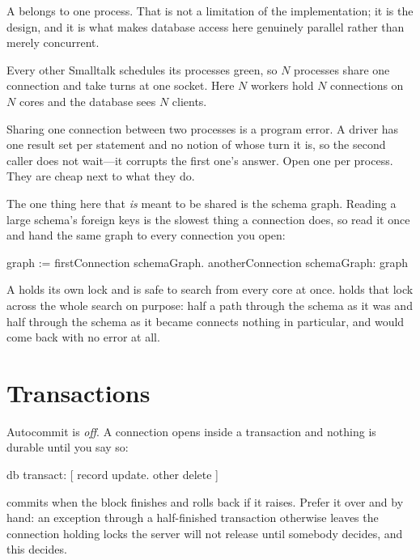 A  belongs to one process. That is not a limitation of the
implementation; it is the design, and it is what makes database access here
genuinely parallel rather than merely concurrent.

Every other Smalltalk schedules its processes green, so $N$ processes share
one connection and take turns at one socket. Here $N$ workers hold $N$
connections on $N$ cores and the database sees $N$ clients.

\begin{stwarn}
Sharing one connection between two processes is a program error. A driver has
one result set per statement and no notion of whose turn it is, so the second
caller does not wait---it corrupts the first one's answer. Open one per
process. They are cheap next to what they do.
\end{stwarn}

The one thing here that \emph{is} meant to be shared is the schema graph.
Reading a large schema's foreign keys is the slowest thing a connection does, so
read it once and hand the same graph to every connection you open:

\begin{st}
graph := firstConnection schemaGraph.
anotherConnection schemaGraph: graph
\end{st}

\noindent A  holds its own lock and is safe to search from
every core at once.  holds that lock across the whole
search on purpose: half a path through the schema as it was and half through the
schema as it became connects nothing in particular, and would come back with no
error at all.

\section{Transactions}

Autocommit is \emph{off}. A connection opens inside a transaction and nothing
is durable until you say so:

\begin{st}
db transact: [ record update. other delete ]
\end{st}

 commits when the block finishes and rolls back if it raises.
Prefer it over  and  by hand: an exception through a
half-finished transaction otherwise leaves the connection holding locks the
server will not release until somebody decides, and this decides.

